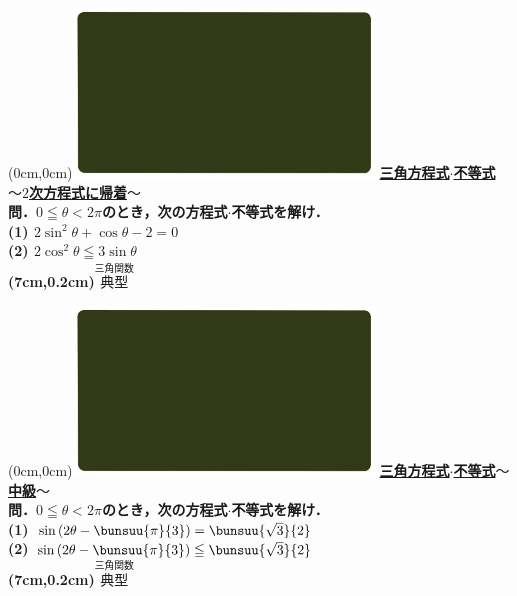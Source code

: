 \documentclass[10pt,
fleqn,
dvipdfmx,
uplatex
]{jsarticle}
\begin{document}
\at(0cm,0cm){\includegraphics[width=8cm,bb=0 0 1920 1080]{./youtube/thumbnails/templates/smart_background/三角関数.jpeg}}
{\color{orange}\bf\boldmath\normalsize\underline{三角方程式$\cdot$不等式$〜2$次方程式に帰着$〜$}}\vspace{0.3zw}\\
\Large 
\bf\boldmath 問．$0\leqq \theta <2\pi$のとき，次の方程式$\cdot$不等式を解け．\\
(1)  $2\sin ^2\theta +\cos \theta -2=0$\\
(2)  $2\cos ^2\theta \leqq 3\sin \theta$\\

\at(7cm,0.2cm){\small\color{bradorange}$\overset{\text{三角関数}}{\text{典型}}$}

\newpage

\at(0cm,0cm){\includegraphics[width=8cm,bb=0 0 1920 1080]{./youtube/thumbnails/templates/smart_background/三角関数.jpeg}}
{\color{orange}\bf\boldmath\Large\underline{三角方程式$\cdot$不等式$〜$中級$〜$}}\vspace{0.3zw}\\
\large 
\bf\boldmath 問．$0\leqq \theta <2\pi$のとき，次の方程式$\cdot$不等式を解け．\\
(1)  $\sin \left(2\theta -\bunsuu{\pi }{3}\right)=\bunsuu{{\sqrt 3}}{2}$\\
(2)  $\sin \left(2\theta -\bunsuu{\pi }{3}\right)\leqq \bunsuu{{\sqrt 3}}{2}$\\

\at(7cm,0.2cm){\small\color{bradorange}$\overset{\text{三角関数}}{\text{典型}}$}

\newpage
\end{document}
